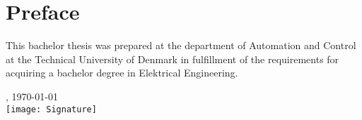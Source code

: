 \chapter{Preface}
This bachelor thesis was prepared at the department of Automation and Control at the Technical University of Denmark in fulfillment of the requirements for acquiring a bachelor degree in Elektrical Engineering.

\vfill

{
\centering
    \thesislocation{}, \today\\[1cm]
    \hspace{3cm}\texttt{[image: Signature]}\\[1cm]
\begin{flushright}
    \thesisauthor{}
\end{flushright}
}
